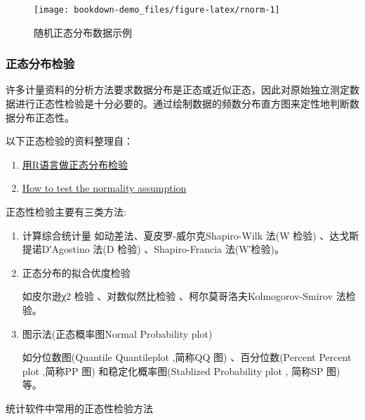 \documentclass[
]{article}
\begin{document}
\begin{figure}

{\centering \texttt{[image: bookdown-demo\_files/figure-latex/rnorm-1]} 

}

\caption{随机正态分布数据示例}\label{fig:rnorm}
\end{figure}

\hypertarget{ux6b63ux6001ux5206ux5e03ux68c0ux9a8c}{%
\subsubsection{正态分布检验}\label{ux6b63ux6001ux5206ux5e03ux68c0ux9a8c}}

许多计量资料的分析方法要求数据分布是正态或近似正态，因此对原始独立测定数据进行正态性检验是十分必要的。通过绘制数据的频数分布直方图来定性地判断数据分布正态性。

以下正态检验的资料整理自：

\begin{enumerate}
\def\labelenumi{\arabic{enumi}.}
\item
  \href{https://blog.csdn.net/u013524655/article/details/41053105?utm_medium=distribute.pc_relevant.none-task-blog-baidulandingword-7\&spm=1001.2101.3001.4242}{用R语言做正态分布检验}
\item
  \href{https://www.statsandr.com/blog/do-my-data-follow-a-normal-distribution-a-note-on-the-most-widely-used-distribution-and-how-to-test-for-normality-in-r/}{How to test the normality assumption}
\end{enumerate}

正态性检验主要有三类方法:

\begin{enumerate}
\def\labelenumi{\arabic{enumi}.}
\item
  计算综合统计量
  如动差法、夏皮罗-威尔克Shapiro-Wilk 法(W 检验) 、达戈斯提诺D′Agostino 法(D 检验) 、Shapiro-Francia 法(W′检验)。
\item
  正态分布的拟合优度检验

  如皮尔逊χ2 检验 、对数似然比检验 、柯尔莫哥洛夫Kolmogorov-Smirov 法检验。
\item
  图示法(正态概率图Normal Probability plot)

  如分位数图(Quantile Quantileplot ,简称QQ 图) 、百分位数(Percent Percent plot ,简称PP 图) 和稳定化概率图(Stablized Probability plot ,
  简称SP 图) 等。
\end{enumerate}

统计软件中常用的正态性检验方法
\end{document}
